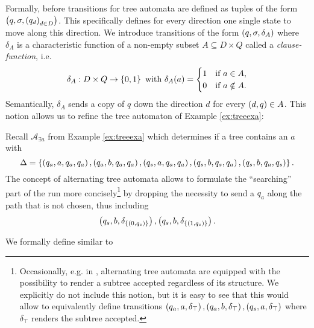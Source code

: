 Formally, before transitions for tree automata are defined as tuples of the 
form $\left(q, \sigma, \left(q_{d}\right)_{d\in D}\right)$. This specifically defines for
every direction one single state to move along this direction. We introduce
transitions of the form $\left(q,\sigma,\delta_{A}\right)$ where $\delta_{A}$ is a 
characteristic function of a non-empty subset $A\subseteq D\times Q$ called a
\emph{clause-function}, i.e.
\begin{equation*}
  \delta_{A}:D\times Q\rightarrow\left\{0,1\right\}\text{ with }
  \delta_{A}(a) = \begin{cases}
    1&\text{if }a\in A,\\
    0&\text{if }a\notin A.
  \end{cases}
\end{equation*}
Semantically, $\delta_{A}$ sends a copy of $q$ down the direction $d$ for every
$\left(d,q\right)\in A$. This notion allows us to refine the tree automaton of 
Example \ref{ex:treeexa}:
\begin{example}
  Recall $\mathcal{A}_{\exists a}$ from Example \ref{ex:treeexa} which
  determines if a tree contains an $a$ with 
  \begin{equation*}
    \Delta = \left\{
      \left(q_{a}, a, q_{a}, q_{a}\right),
      \left(q_{a}, b, q_{a}, q_{a}\right),
      \left(q_{s}, a, q_{a}, q_{a}\right),
      \left(q_{s}, b, q_{s}, q_{a}\right),
      \left(q_{s}, b, q_{a}, q_{s}\right)
    \right\}.
  \end{equation*}
  The concept of alternating tree automata allows to formulate the
  \enquote{searching} part of the run more concisely\footnote{
    Occasionally, e.g. in \cite[Chapter 9]{AutoLogInfGames}, alternating tree
    automata are equipped with the possibility to render a subtree accepted 
    regardless of its structure. We explicitly do not include this notion, but 
    it is easy to see that this would allow to equivalently define transitions
    $\left(q_{a}, a, \delta_{\top}\right),\left(q_{a}, b, \delta_{\top}\right),
    \left(q_{s}, a, \delta_{\top}\right)$ where $\delta_{\top}$ renders the subtree
    accepted.
  }
  by dropping the necessity to send a $q_{a}$ along the
  path that is not chosen, thus including
  \begin{equation*}
    \left(q_{s}, b, \delta_{\left\{\left(0, q_{s}\right)\right\}}\right),
    \left(q_{s}, b, \delta_{\left\{\left(1, q_{s}\right)\right\}}\right).
  \end{equation*}
\end{example}
We formally define similar to \cite{SynProbEnv}
